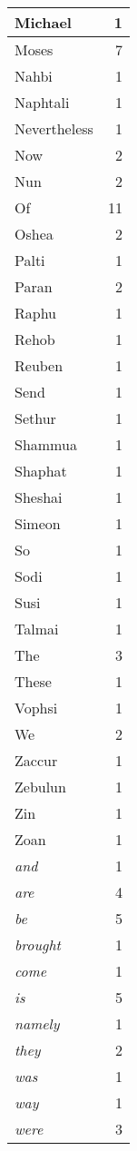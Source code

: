 \begin{center}
\begin{longtable}{l|r}
Michael & 1\\ \hline 
Moses & 7\\ \hline 
Nahbi & 1\\ \hline 
Naphtali & 1\\ \hline 
Nevertheless & 1\\ \hline 
Now & 2\\ \hline 
Nun & 2\\ \hline 
Of & 11\\ \hline 
Oshea & 2\\ \hline 
Palti & 1\\ \hline 
Paran & 2\\ \hline 
Raphu & 1\\ \hline 
Rehob & 1\\ \hline 
Reuben & 1\\ \hline 
Send & 1\\ \hline 
Sethur & 1\\ \hline 
Shammua & 1\\ \hline 
Shaphat & 1\\ \hline 
Sheshai & 1\\ \hline 
Simeon & 1\\ \hline 
So & 1\\ \hline 
Sodi & 1\\ \hline 
Susi & 1\\ \hline 
Talmai & 1\\ \hline 
The & 3\\ \hline 
These & 1\\ \hline 
Vophsi & 1\\ \hline 
We & 2\\ \hline 
Zaccur & 1\\ \hline 
Zebulun & 1\\ \hline 
Zin & 1\\ \hline 
Zoan & 1\\ \hline 
\emph{and} & 1\\ \hline 
\emph{are} & 4\\ \hline 
\emph{be} & 5\\ \hline 
\emph{brought} & 1\\ \hline 
\emph{come} & 1\\ \hline 
\emph{is} & 5\\ \hline 
\emph{namely} & 1\\ \hline 
\emph{they} & 2\\ \hline 
\emph{was} & 1\\ \hline 
\emph{way} & 1\\ \hline 
\emph{were} & 3\\ \hline 

\end{longtable}
\end{center}
